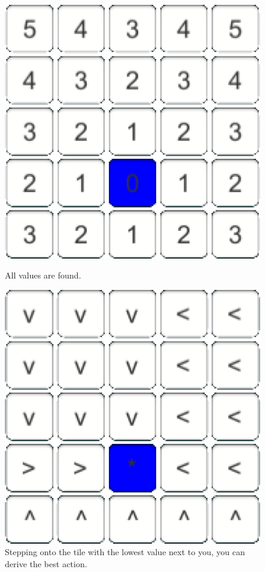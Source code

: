 \documentclass[conference]{IEEEtran}
\begin{document}
\begin{figure}[h]
\centering
\begin{minipage}[t]{0.3\linewidth}
\centering
\includegraphics[width=1\textwidth]{images/ValueFunction/all.png}
\caption{All values are found.}
\end{minipage}
\begin{minipage}{0.2\linewidth}
\end{minipage}
\begin{minipage}[t]{0.3\linewidth}
\centering
\includegraphics[width=1\textwidth]{images/ValueFunction/policy.png}
\caption{Stepping onto the tile with the lowest value next to you, you can derive the best action.}
\end{minipage}
\end{figure}
\end{document}
